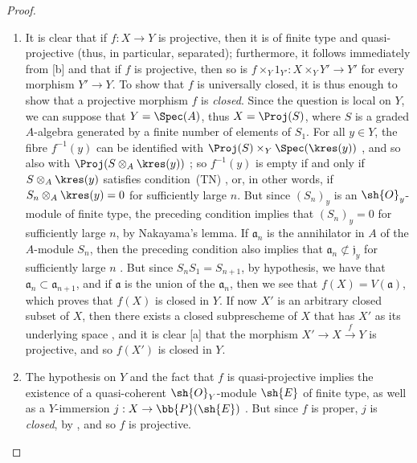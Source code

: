 \begin{proof}
\medskip\noindent
\begin{enumerate}
  \item[(i)] It is clear that if $f:X\to Y$ is projective, then it is of finite type and quasi-projective (thus, in particular, separated); furthermore, it follows immediately from [b] and  that if $f$ is projective, then so is $f\times_Y 1_{Y'}:X\times_Y Y'\to Y'$ for every morphism $Y'\to Y$.
     To show that $f$ is universally closed, it is thus enough to show that a projective morphism $f$ is \emph{closed}.
     Since the question is local on $Y$, we can suppose that $Y=\Spec(A)$, thus  $X=\Proj(S)$, where $S$ is a graded $A$-algebra generated by a finite number of elements of $S_1$.
     For all $y\in Y$, the fibre $f^{-1}(y)$ can be identified with $\Proj(S)\times_Y\Spec(\kres(y))$ , and so also with $\Proj(S\otimes_A\kres(y))$ ;
     so $f^{-1}(y)$ is empty if and only if $S\otimes_A\kres(y)$ satisfies condition~(TN) , or, in other words, if $S_n\otimes_A\kres(y)=0$ for sufficiently large $n$.
     But since $(S_n)_y$ is an $\sh{O}_y$-module of finite type, the preceding condition implies that $(S_n)_y=0$ for sufficiently large $n$, by Nakayama's lemma.
     If $\mathfrak{a}_n$ is the annihilator in $A$ of the $A$-module $S_n$, then the preceding condition also implies that $\mathfrak{a}_n\not\subset\mathfrak{j}_y$ for sufficiently large $n$ .
     But since $S_nS_1=S_{n+1}$, by hypothesis, we have that $\mathfrak{a}_n\subset\mathfrak{a}_{n+1}$, and if $\mathfrak{a}$ is the union of the $\mathfrak{a}_n$, then we see that $f(X)=V(\mathfrak{a})$, which proves that $f(X)$ is closed in $Y$.
     If now $X'$ is an arbitrary closed subset of $X$, then there exists a closed subprescheme of $X$ that has $X'$ as its underlying space , and it is clear [a] that the morphism $X'\to X\xrightarrow{f}Y$ is projective, and so $f(X')$ is closed in $Y$.
   \item[(ii)] The hypothesis on $Y$ and the fact that $f$ is quasi-projective implies the existence of a quasi-coherent $\sh{O}_Y$-module $\sh{E}$ of finite type, as well as a $Y$-immersion $j:X\to\bb{P}(\sh{E})$ .
      But since $f$ is proper, $j$ is \emph{closed}, by , and so $f$ is projective.
\end{enumerate}
\end{proof}

